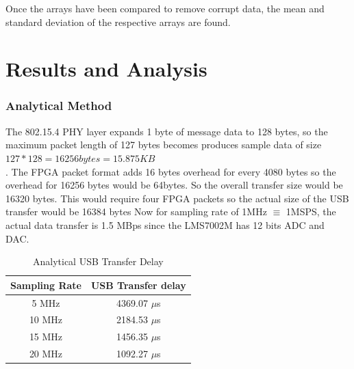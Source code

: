 \documentclass{kththesis}
\begin{document}
Once the arrays have been compared to remove corrupt data, the mean and standard deviation of the respective arrays are found.

\chapter{Results and Analysis}
\subsection{Analytical Method}
The 802.15.4 PHY layer expands 1 byte of message data to 128 bytes, so the maximum packet length of 127 bytes becomes produces sample data of size
$127*128=16256 bytes=15.875KB$\\. The FPGA packet format adds 16 bytes overhead for every 4080 bytes so the overhead for 16256 bytes would be 64bytes. So the overall transfer size would be 16320 bytes. This would require four FPGA packets so the actual size of the USB transfer would be 16384 bytes
Now for sampling rate of 1MHz $\equiv$ 1MSPS, the actual data transfer is 1.5 MBps since the LMS7002M has 12 bits ADC and DAC. 
\begin{table}[!h]
\centering
\begin{tabular}{|c|c|}
\hline
Sampling Rate & USB Transfer delay \\
\hline
5 MHz & 4369.07 $\mu$s\\
10 MHz & 2184.53 $\mu$s\\
15 MHz & 1456.35 $\mu$s\\
20 MHz & 1092.27 $\mu$s\\
\hline
\end{tabular}
\caption{Analytical USB Transfer Delay}
\label{back_env}
\end{table}
\end{document}
